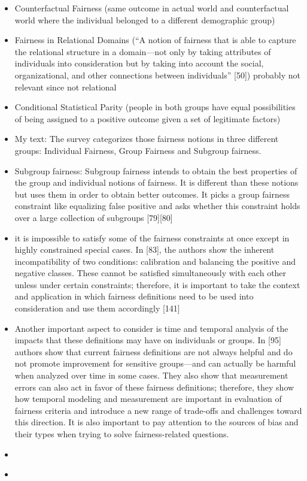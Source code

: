 \documentclass[12pt, a4paper, oneside]{book}   	%
\begin{document}
\begin{itemize}
\begin{itemize}
					\item Counterfactual Fairness (same outcome in actual world and counterfactual world where the individual belonged to a different demographic group) \autocite{Mehrabi_2021}
					\item Fairness in Relational Domains (“A notion of fairness that is able to capture the relational structure in a domain—not only by taking attributes of individuals into consideration but by taking into account the social, organizational, and other connections between individuals” [50]) \autocite{Mehrabi_2021} probably not relevant since not relational
					\item Conditional Statistical Parity (people in both groups have equal possibilities of being assigned to a positive outcome given a set of legitimate factors) \autocite{Mehrabi_2021}
					\item My text: The survey categorizes those fairness notions in three different groups: Individual Fairness, Group Fairness and Subgroup fairness.  \autocite{Mehrabi_2021}
					\item Subgroup fairness: Subgroup fairness intends to obtain the best properties of the group and individual notions of fairness. It is different than these notions but uses them in order to obtain better outcomes. It picks a group fairness constraint like equalizing false positive and asks whether this constraint holds over a large collection of subgroups [79][80]\autocite{Mehrabi_2021}
					\item it is impossible to satisfy some of the fairness constraints at once except in highly constrained special cases. In [83], the authors show the inherent incompatibility of two conditions: calibration and balancing the positive and negative classes. These cannot be satisfied simultaneously with each other unless under certain constraints; therefore, it is important to take the context and application in which fairness definitions need to be used into consideration and use them accordingly [141]\autocite{Mehrabi_2021}
					\item Another important aspect to consider is time and temporal analysis of the impacts that these definitions may have on individuals or groups. In [95] authors show that current fairness definitions are not always helpful and do not promote improvement for sensitive groups—and can actually be harmful when analyzed over time in some cases. They also show that measurement errors can also act in favor of these fairness definitions; therefore, they show how temporal modeling and measurement are important in evaluation of fairness criteria and introduce a new range of trade-offs and challenges toward this direction. It is also important to pay attention to the sources of bias and their types when trying to solve fairness-related questions. \autocite{Mehrabi_2021}
					\item \autocite{Mehrabi_2021}
					\item \autocite{Mehrabi_2021}
				\end{itemize}
			\end{itemize}
			
\end{document}
